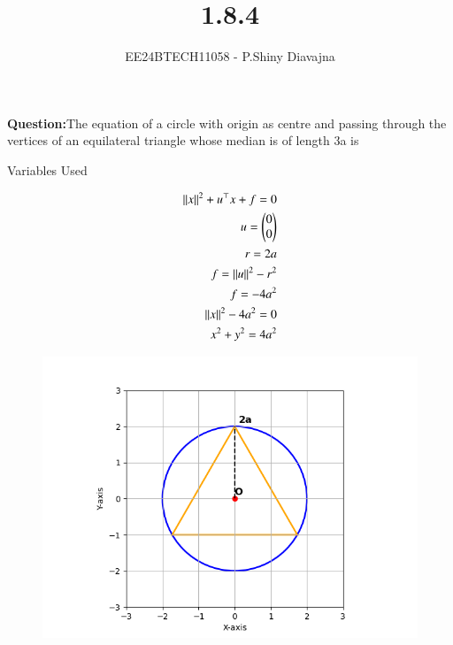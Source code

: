 \documentclass[journal]{IEEEtran}
\begin{document}

\vspace{3cm}

\title{1.8.4}
\author{EE24BTECH11058 - P.Shiny Diavajna}
{\let\newpage\relax\maketitle}

\renewcommand{\thefigure}{\theenumi}
\renewcommand{\thetable}{\theenumi}
\setlength{\intextsep}{10pt} %


\renewcommand{\thetable}{\theenumi}

\textbf{Question:}The equation of a circle with origin as centre and passing through the vertices of an equilateral triangle whose median is of length 3a is \\


   \solution
   \begin{table}[h!]    
     \centering
     
     \caption{Variables Used}
     \label{}
   \end{table}

    \begin{align}
	   {\left\lVert x\right\rVert} ^ 2 + {u}^\top x + f =0\\
	   u = \begin{pmatrix}0\\ 0\end{pmatrix}\\
      r = 2a\\
	   f = {\left\lVert u\right\rVert}^2 - {r}^2 \\
	   f = -4 {a} ^2\\
	    {\left\lVert x\right\rVert} ^ 2 - 4a ^2 =0\\
	   x^2 + y^2 = 4a^2\\
	     \end{align}	
	  
    \begin{figure}[h]
    \centering
    \includegraphics[width=\columnwidth]{figs/Figure_1.png}
 \end{figure}
\end{document}
